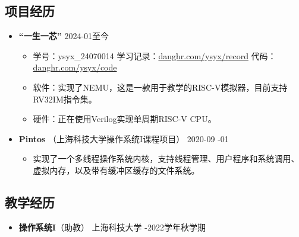 \documentclass[a4paper,10pt]{ctexart} %
\begin{document}
\begin{keepsection}
    \subsection{项目经历}
    \begin{itemize}
        \item \textbf{``一生一芯''} \hfill 2024-01至今
        \begin{small}
            \begin{itemize}
                \item 学号：ysyx\_24070014 \quad 学习记录：\href{https://www.danghr.com/ysyx/record}{danghr.com/ysyx/record} \quad 代码：\href{https://www.danghr.com/ysyx/code}{danghr.com/ysyx/code}
                \item 软件：实现了NEMU，这是一款用于教学的RISC-V模拟器，目前支持RV32IM指令集。
                \item 硬件：正在使用Verilog实现单周期RISC-V CPU。
            \end{itemize}
        \end{small}
        \item \textbf{Pintos} {\small （上海科技大学操作系统I课程项目）} \hfill 2020-09 -01
    \begin{small}
        \begin{itemize}
            \item 实现了一个多线程操作系统内核，支持线程管理、用户程序和系统调用、虚拟内存，以及带有缓冲区缓存的文件系统。
        \end{itemize}
    \end{small}
    \end{itemize}
    \end{keepsection}

\begin{keepsection}
\subsection{教学经历}

    \begin{itemize}
        \item \textbf{操作系统I}（助教） \hfill 上海科技大学 -2022学年秋学期
    \end{itemize}
\end{keepsection}


\end{document}

